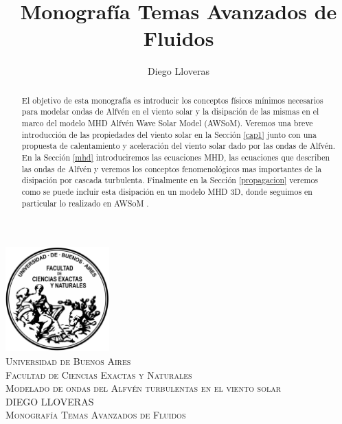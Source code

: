 \documentclass[a4paper,11pt]{report}
\title{Monografía Temas Avanzados de Fluidos}
\author{Diego Lloveras}
\begin{document}
\begin{center}
\includegraphics[width=0.3\textwidth]{figuras/Logo-fcenuba.pdf}\\[1cm]
\textsc{\LARGE Universidad de Buenos Aires}\\[0.5cm]
\textsc{\large Facultad de Ciencias Exactas y Naturales}\\[1cm]
\textsc{\LARGE Modelado de ondas del Alfvén turbulentas en el viento solar}\\[1cm]
\textsc{\large DIEGO LLOVERAS}\\[0.7cm]

\textsc{\large Monografía Temas Avanzados de Fluidos}\\[0.5cm]
\end{center}
\tableofcontents

\begin{abstract}
El objetivo de esta monografía es introducir los conceptos físicos mínimos necesarios para modelar ondas de Alfvén en el viento solar y la disipación de las mismas en el marco del modelo MHD Alfvén Wave Solar Model (AWSoM). Veremos una breve introducción de las propiedades del viento solar en la Sección \ref{cap1} junto con una propuesta de calentamiento y aceleración del viento solar dado por las ondas de Alfvén. En la Sección \ref{mhd} introduciremos las ecuaciones MHD, las ecuaciones que describen las ondas de Alfvén y veremos los conceptos fenomenológicos mas importantes de la disipación por cascada turbulenta. Finalmente en la Sección \ref{propagacion} veremos como se puede incluir esta disipación en un modelo MHD 3D, donde seguimos en particular lo realizado en AWSoM \citep{vander_2014}.%
\end{abstract}
\end{document}
